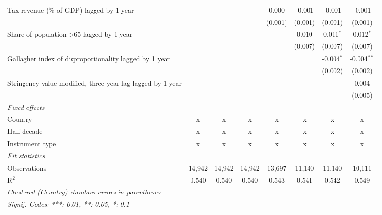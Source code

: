 \begin{tabular}{lccccccc}
   Tax revenue (\% of GDP) lagged by 1 year                                 &         &         &              & 0.000         & -0.001      & -0.001       & -0.001\\   
                                                                            &         &         &              & (0.001)       & (0.001)     & (0.001)      & (0.001)\\   
   Share of population >65 lagged by 1 year                                 &         &         &              &               & 0.010       & 0.011$^{*}$  & 0.012$^{*}$\\   
                                                                            &         &         &              &               & (0.007)     & (0.007)      & (0.007)\\   
   Gallagher index of disproportionality lagged by 1 year                   &         &         &              &               &             & -0.004$^{*}$ & -0.004$^{**}$\\   
                                                                            &         &         &              &               &             & (0.002)      & (0.002)\\   
   Stringency value modified, three-year lag lagged by 1 year               &         &         &              &               &             &              & 0.004\\   
                                                                            &         &         &              &               &             &              & (0.005)\\   
   \emph{Fixed effects}\\
   Country                                                                  & x       & x       & x            & x             & x           & x            & x\\  
   Half decade                                                              & x       & x       & x            & x             & x           & x            & x\\  
   Instrument type                                                          & x       & x       & x            & x             & x           & x            & x\\  
   \midrule \emph{Fit statistics}\\
   Observations                                                             & 14,942  & 14,942  & 14,942       & 13,697        & 11,140      & 11,140       & 10,111\\  
   R$^2$                                                                    & 0.540   & 0.540   & 0.540        & 0.543         & 0.541       & 0.542        & 0.549\\  
   \midrule
   \multicolumn{8}{l}{\emph{Clustered (Country) standard-errors in parentheses}}\\
   \multicolumn{8}{l}{\emph{Signif. Codes: ***: 0.01, **: 0.05, *: 0.1}}\\
\end{tabular}
\par\endgroup



